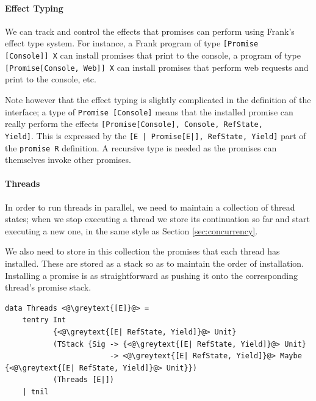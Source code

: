 \documentclass[msc,deptreport,cs]{infthesis} %
\newcommand{\code}[1]{\lstinline{#1}}
\newcommand{\greytext}[1]{\textcolor{black!40}{#1}}
\newcommand{\todo}[1]
           {{\par\noindent\small\color{RoyalPurple}
  \framebox{\parbox{\dimexpr\linewidth-2\fboxsep-2\fboxrule}
    {\textbf{TODO:} #1}}}}
\begin{document}
\paragraph*{Effect Typing}

We can track and control the effects that promises can perform using Frank's
effect type system. For instance, a Frank program of type \code{[Promise
    [Console]] X} can install promises that print to the console, a program of
type \code{[Promise[Console, Web]] X} can install promises that perform web
requests and print to the console, etc.

Note however that the effect typing is slightly complicated in the definition of the
interface; a type of \code{Promise [Console]} means that the installed promise
can really perform the effects \code{[Promise[Console], Console, RefState,
    Yield]}. This is expressed by the \code{[E | Promise[E|], RefState, Yield]}
part of the \code{promise R} definition. A recursive type is needed as the
promises can themselves invoke other promises.

\todo{Flesh this out, rewrite it}

\paragraph*{Threads}


In order to run threads in parallel, we need to maintain a collection of
thread states; when we stop executing a thread we store its continuation so far
and start executing a new one, in the same style as Section
\ref{sec:concurrency}.

We also need to store in this collection the promises that each thread has
installed. These are stored as a stack so as to maintain the order of
installation. Installing a promise is as straightforward as pushing it
onto the corresponding thread's promise stack.


\begin{lstlisting}
data Threads <@\greytext{[E]}@> =
    tentry Int
           {<@\greytext{[E| RefState, Yield]}@> Unit}
           (TStack {Sig -> {<@\greytext{[E| RefState, Yield]}@> Unit}
                        -> <@\greytext{[E| RefState, Yield]}@> Maybe {<@\greytext{[E| RefState, Yield]}@> Unit}})
           (Threads [E|])
    | tnil
\end{lstlisting}
\end{document}
